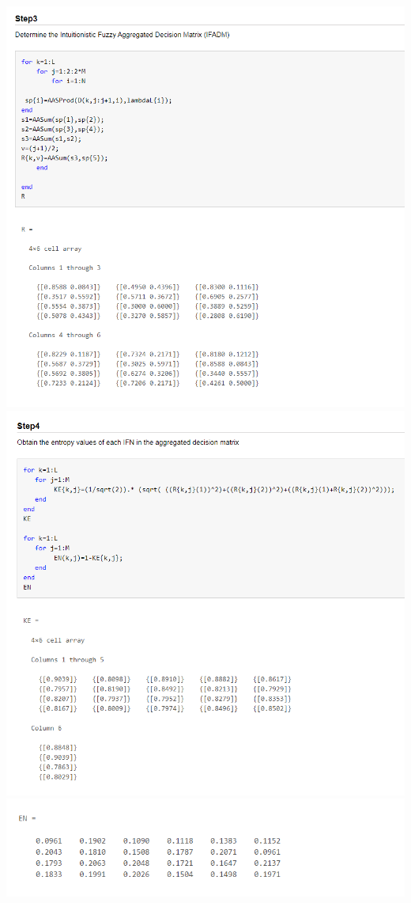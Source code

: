 \begin{flushleft}
\includegraphics[width = 16cm]{config/pictures/image12.png} 
\includegraphics[width = 16cm]{config/pictures/image13.png} 
\includegraphics[width = 16cm]{config/pictures/image14.png} 

\end{flushleft}
